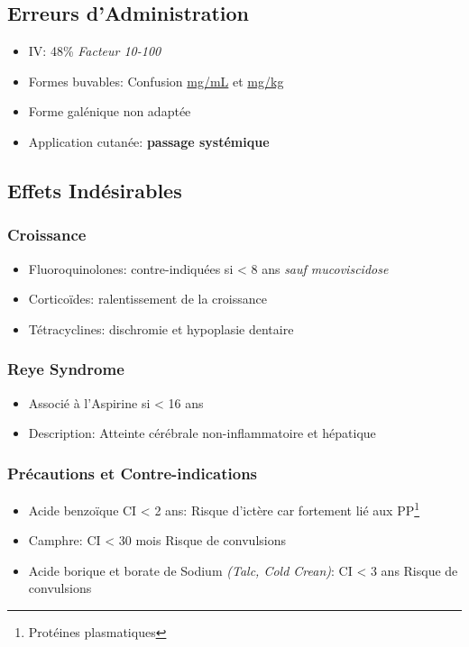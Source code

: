 \documentclass[11pt]{article}
\begin{document}
\subsection{Erreurs d'Administration}
\label{sec:orgec68cc3}
\begin{itemize}
\item IV: 48\% \emph{Facteur 10-100}
\item Formes buvables: Confusion \uline{mg/mL} et \uline{mg/kg}
\item Forme galénique non adaptée
\item Application cutanée: \textbf{passage systémique}
\end{itemize}
\subsection{Effets Indésirables}
\label{sec:org638ed63}
\subsubsection{Croissance}
\label{sec:org638e77c}
\begin{itemize}
\item Fluoroquinolones: contre-indiquées si < 8 ans \emph{sauf mucoviscidose}
\item Corticoïdes: ralentissement de la croissance
\item Tétracyclines: dischromie et hypoplasie dentaire
\end{itemize}
\subsubsection{Reye Syndrome}
\label{sec:org3ea67bf}
\begin{itemize}
\item Associé à l'Aspirine si < 16 ans
\item Description: Atteinte cérébrale non-inflammatoire et hépatique
\end{itemize}
\subsubsection{Précautions et Contre-indications}
\label{sec:orgf280f15}
\begin{itemize}
\item Acide benzoïque CI < 2 ans:
Risque d'ictère car fortement lié aux PP\footnote{Protéines plasmatiques}
\item Camphre: CI < 30 mois
Risque de convulsions
\item Acide borique et borate de Sodium \emph{(Talc, Cold Crean)}: CI < 3 ans
Risque de convulsions
\end{itemize}
\end{document}
